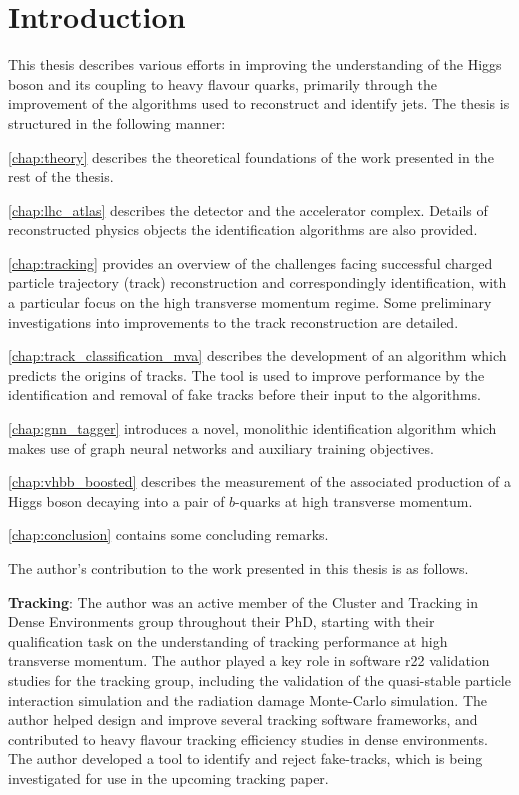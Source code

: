 \chapter{Introduction}\label{chap:intro}


This thesis describes various efforts in improving the understanding of the Higgs boson and its coupling to heavy flavour quarks, primarily through the improvement of the algorithms used to reconstruct and identify jets.
The thesis is structured in the following manner:

\cref{chap:theory} describes the theoretical foundations of the work presented in the rest of the thesis.

\cref{chap:lhc_atlas} describes the \ATLAS detector and the \CERN accelerator complex. Details of reconstructed physics objects the \bjet identification algorithms are also provided.

\cref{chap:tracking} provides an overview of the challenges facing successful charged particle trajectory (track) reconstruction and correspondingly \bjet identification, with a particular focus on the high transverse momentum regime. Some preliminary investigations into improvements to the track reconstruction are detailed.

\cref{chap:track_classification_mva} describes the development of an algorithm which predicts the origins of tracks. The tool is used to improve \btagging performance by the identification and removal of fake tracks before their input to the \btagging algorithms.

\cref{chap:gnn_tagger} introduces a novel, monolithic \bjet identification algorithm which makes use of graph neural networks and auxiliary training objectives.

\cref{chap:vhbb_boosted} describes the measurement of the associated production of a Higgs boson decaying into a pair of $b$-quarks at high transverse momentum.

\cref{chap:conclusion} contains some concluding remarks.


\clearpage

The author's contribution to the work presented in this thesis is as follows.

\textbf{Tracking}:
The author was an active member of the Cluster and Tracking in Dense Environments group throughout their PhD, starting with their qualification task on the understanding of tracking performance at high transverse momentum.
The author played a key role in software r22 validation studies for the tracking group, including the validation of the quasi-stable particle interaction simulation and the radiation damage Monte-Carlo simulation. 
The author helped design and improve several tracking software frameworks, and contributed to heavy flavour tracking efficiency studies in dense environments.
The author developed a tool to identify and reject fake-tracks, which is being investigated for use in the upcoming tracking paper.

